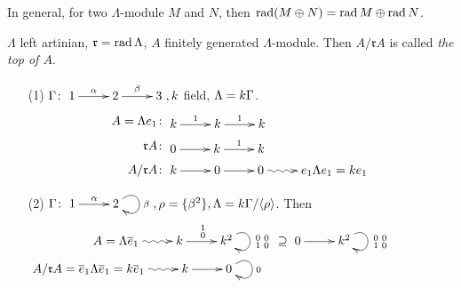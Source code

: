 \begin{note}
In general, for two $\Lambda$-module $M$ and $N$, then $\operatorname{rad}\nolimits(M \oplus
N) = \operatorname{rad}\nolimits M \oplus \operatorname{rad}\nolimits N$. 
\end{note}

\begin{defin} 
$\Lambda$ left artinian, $\mathfrak{r} = \operatorname{rad}\nolimits \Lambda$, $A$ finitely
generated $\Lambda$-module. Then $A / \mathfrak{r}A$ is called
\emph{the top of $A$}.  
\end{defin}
\begin{exam}
\begin{enumerate}
\item[(1)] $\G \colon \xymatrix{1 \ar[r]^\alpha & 2\ar[r]^\beta & 3 }, k$ field, $\Lambda = k\Gamma$.\\
\begin{equation*}
\begin{split}
A = \Lambda e_1 \colon& \vcenter{\xymatrix@R-1pc{
k\ar[r]^1 &
k\ar[r]^1 &
k
}}\\
\mathfrak{r}A \colon& \vcenter{\xymatrix@R-1pc{
0\ar[r] &
k\ar[r]^1 &
k
}}\\
A/\mathfrak{r}A \colon& \vcenter{\xymatrix@R-1pc{
k\ar[r] &
0\ar[r] &
0\ar@{~>}[r] & e_1 \Lambda e_1 = ke_1
}}
\end{split}
\end{equation*}

\item[(2)] $\G \colon \xymatrix{1 \ar[r]^\alpha & 2 \ar@(ur, dr)^\beta},
  \rho = \{ \beta^2 \}, \Lambda = k\G / \langle \rho \rangle$. Then 
\[\xymatrix
{A = \Lambda \overline{e}_1  \ar@{~>}[r] & 
k\ar[r]^{\begin{smallmatrix} 1\\0 \end{smallmatrix}} & 
k^2 \ar@(ur, dr)^{\begin{smallmatrix} 0&0\\1&0 \end{smallmatrix}}
} 
\supseteq 
\xymatrix
{
0\ar[r] & 
k^2 \ar@(ur, dr)^{\begin{smallmatrix} 0&0\\1&0 \end{smallmatrix}}
}\]
$\xymatrix
{
A/\mathfrak{r}A = \overline{e}_1\Lambda \overline{e}_1 = k\overline{e}_1  \ar@{~>}[r] & 
k\ar[r] & 0 \ar@(ur, dr)^{0}
}$\\
\end{enumerate}
\end{exam}


